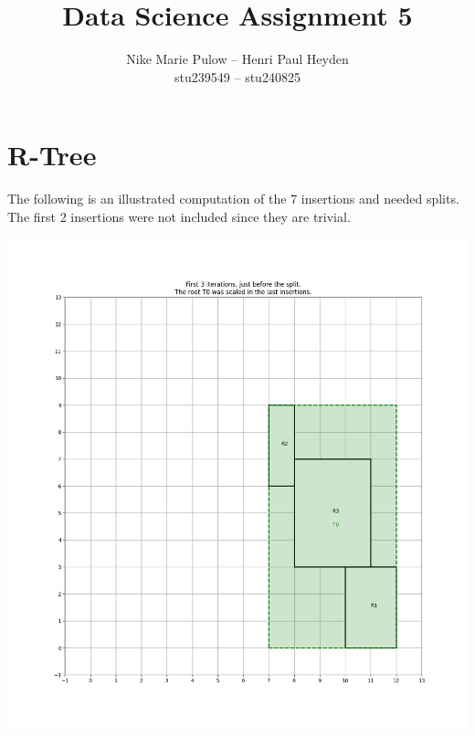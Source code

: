 

\newcommand{\nr}{5}
\title{Data Science Assignment \nr}
\author{Nike Marie Pulow -- Henri Paul Heyden \\ \small stu239549 -- stu240825}
\date{}


    \maketitle
    \section{R-Tree}
    The following is an illustrated computation of the 7 insertions and needed splits. \\
    The first 2 insertions were not included since they are trivial.
    \begin{center}
        \includegraphics[scale=0.5]{./A1 figs/iter3.png}

\end{center}
